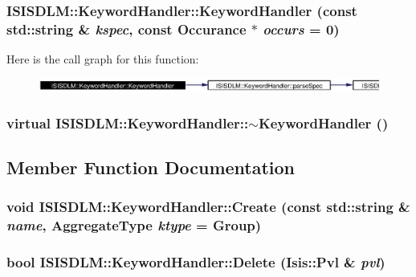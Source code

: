 \subsubsection{\setlength{\rightskip}{0pt plus 5cm}ISISDLM::Keyword\-Handler::Keyword\-Handler (const std::string \& {\em kspec}, const {\bf Occurance} $\ast$ {\em occurs} = 0)}\label{classISISDLM_1_1KeywordHandler_a1}




Here is the call graph for this function:\begin{figure}[H]
\begin{center}
\leavevmode
\includegraphics[width=389pt]{classISISDLM_1_1KeywordHandler_a1_cgraph}
\end{center}
\end{figure}
\subsubsection{\setlength{\rightskip}{0pt plus 5cm}virtual ISISDLM::Keyword\-Handler::$\sim${\bf Keyword\-Handler} ()\hspace{0.3cm}{\tt  [inline, virtual]}}\label{classISISDLM_1_1KeywordHandler_a2}




\subsection{Member Function Documentation}
\subsubsection{\setlength{\rightskip}{0pt plus 5cm}void ISISDLM::Keyword\-Handler::Create (const std::string \& {\em name}, {\bf Aggregate\-Type} {\em ktype} = Group)}\label{classISISDLM_1_1KeywordHandler_a9}


\subsubsection{\setlength{\rightskip}{0pt plus 5cm}bool ISISDLM::Keyword\-Handler::Delete (Isis::Pvl \& {\em pvl})}\label{classISISDLM_1_1KeywordHandler_a12}


